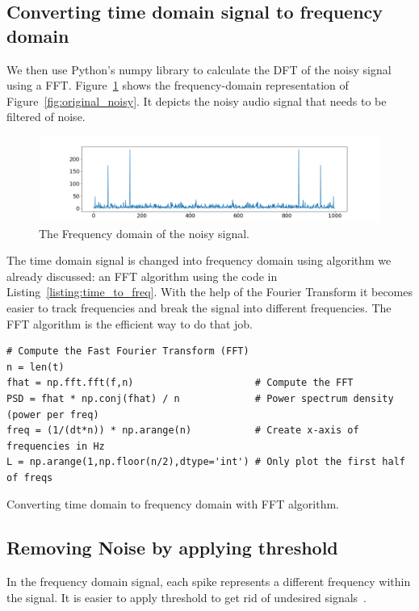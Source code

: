 \documentclass[a4paper, 12pt]{scrartcl}
\begin{document}
\subsection{Converting time domain signal to frequency domain}
We then use Python's numpy library to calculate the DFT of the noisy signal using a FFT.
Figure~\ref{fig:time_to_freq} shows the frequency-domain representation of Figure~\ref{fig:original_noisy}.
It depicts the noisy audio signal that needs to be filtered of noise.
\begin{figure}[H] 
  \centering
  \includegraphics[width=\textwidth]{img/time_to_freq.png}
  \caption{The Frequency domain of the noisy signal.}
  \label{fig:time_to_freq}
\end{figure}
The time domain signal is changed into frequency domain using algorithm we already discussed: an FFT algorithm using the code in Listing~\ref{listing:time_to_freq}.
With the help of the Fourier Transform it becomes easier to track frequencies and break the signal into different frequencies.
The FFT algorithm is the efficient way to do that job.
\begin{listing}[h]
\begin{verbatim}
# Compute the Fast Fourier Transform (FFT)
n = len(t)
fhat = np.fft.fft(f,n)                     # Compute the FFT
PSD = fhat * np.conj(fhat) / n             # Power spectrum density (power per freq)
freq = (1/(dt*n)) * np.arange(n)           # Create x-axis of frequencies in Hz
L = np.arange(1,np.floor(n/2),dtype='int') # Only plot the first half of freqs
\end{verbatim}
\caption{Converting time domain to frequency domain with FFT algorithm.}
\label{listing:time_to_freq}
\end{listing}

\subsection{Removing Noise by applying threshold}

In the frequency domain signal, each spike represents a different frequency within the signal.
It is easier to apply threshold to get rid of undesired signals~\cite{fftfilter}.  
\end{document}
